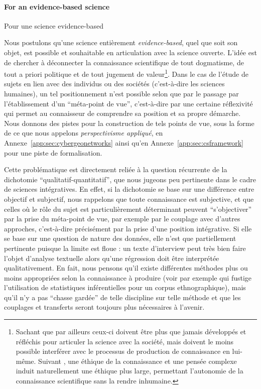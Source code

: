 \paragraph{For an evidence-based science}{Pour une science evidence-based}

Nous postulons qu'une science entièrement \emph{evidence-based}, quel que soit son objet, est possible et souhaitable en articulation avec la science ouverte. L'idée est de chercher à déconnecter la connaissance scientifique de tout dogmatisme, de tout a priori politique et de tout jugement de valeur\footnote{Sachant que par ailleurs ceux-ci doivent être plus que jamais développés et réfléchis pour articuler la science avec la société, mais doivent le moins possible interférer avec le processus de production de connaissance en lui-même. Suivant \cite{morin2004methode}, une éthique de la connaissance et une pensée complexe induit naturellement une éthique plus large, permettant l'autonomie de la connaissance scientifique sans la rendre inhumaine.}. Dans le cas de l'étude de sujets en lien avec des individus ou des sociétés (c'est-à-dire les sciences humaines), un tel positionnement n'est possible selon \cite{morin1991methode} que par le passage par l'établissement d'un ``méta-point de vue'', c'est-à-dire par une certaine réflexivité qui permet au connaisseur de comprendre sa position et sa propre démarche. Nous donnons des pistes pour la construction de tels points de vue, sous la forme de ce que nous appelons \emph{perspectivisme appliqué}, en Annexe~\ref{app:sec:cybergeonetworks} ainsi qu'en Annexe~\ref{app:sec:csframework} pour une piste de formalisation.


Cette problématique est directement reliée à la question récurrente de la dichotomie ``qualitatif-quantitatif'', que nous jugeons peu pertinente dans le cadre de sciences intégratives. En effet, si la dichotomie se base sur une différence entre objectif et subjectif, nous rappelons que toute connaissance est subjective, et que celles où le rôle du sujet est particulièrement déterminant peuvent ``s'objectiver'' par la prise du méta-point de vue, par exemple par le couplage avec d'autres approches, c'est-à-dire précisément par la prise d'une position intégrative. Si elle se base sur une question de nature des données, elle n'est que partiellement pertinente puisque la limite est floue : un texte d'interview peut très bien faire l'objet d'analyse textuelle alors qu'une régression doit être interprétée qualitativement. En fait, nous pensons qu'il existe différentes méthodes plus ou moins appropriées selon la connaissance à produire (voir par exemple \cite{gros2017quantifier} qui fustige l'utilisation de statistiques inférentielles pour un corpus ethnographique), mais qu'il n'y a pas ``chasse gardée'' de telle discipline sur telle méthode et que les couplages et transferts seront toujours plus nécessaires à l'avenir.


